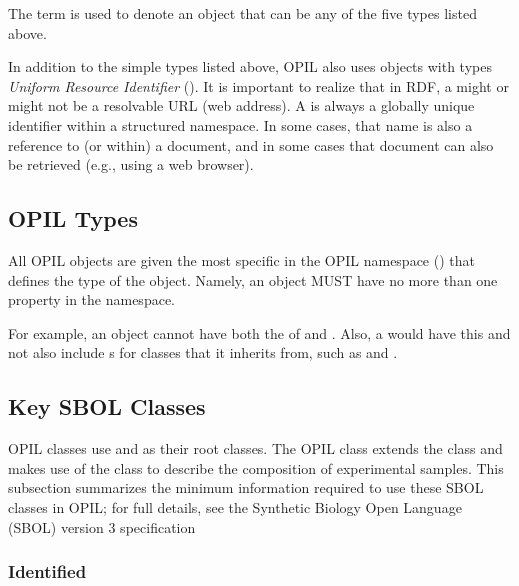 The term  is used to denote an object that can be any of the five types listed above.

In addition to the simple types listed above, OPIL also uses objects with types \emph{Uniform Resource Identifier} (). It is important to realize that in RDF, a  might or might not be a resolvable URL (web address).  A  is always a globally unique identifier within a structured namespace.  In some cases, that name is also a reference to (or within) a document, and in some cases that document can also be retrieved (e.g., using a web browser).

\subsection{OPIL Types}
\label{sec:sbolTypes}

All OPIL objects are given the most specific  in the OPIL namespace () that defines the type of the object.  Namely, an object MUST have no more than one  property in the  namespace.

For example, an object cannot have both the  of  and .  Also, a  would have this  and not also include s for classes that it inherits from, such as  and .

\subsection{Key SBOL Classes}

OPIL classes use  and  as their root classes.
The OPIL  class extends the  class and makes use of the  class to describe the composition of experimental samples.
This subsection summarizes the minimum information required to use these SBOL classes in OPIL; for full details, see the Synthetic Biology Open Language (SBOL) version 3 specification~\citep{SBOL3}

\subsubsection{Identified}

